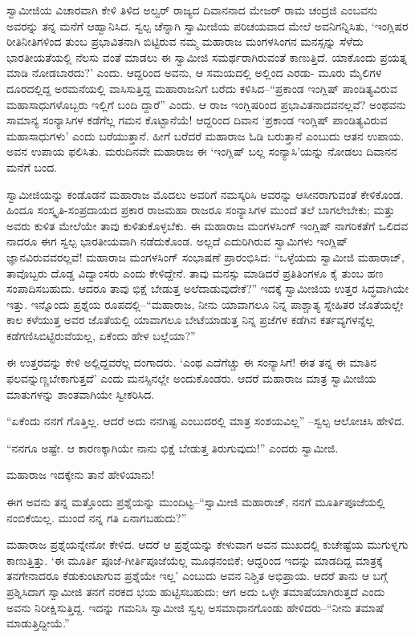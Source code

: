 ಸ್ವಾಮೀಜಿಯ ವಿಚಾರವಾಗಿ ಕೇಳಿ ತಿಳಿದ ಅಲ್ವರ್ ರಾಜ್ಯದ ದಿವಾನನಾದ ಮೇಜರ್ ರಾಮ ಚಂದ್ರಜಿ ಎಂಬವನು ಅವರನ್ನು ತನ್ನ ಮನೆಗೆ ಆಹ್ವಾನಿಸಿದ. ಸ್ವಲ್ಪ ಚೆನ್ನಾಗಿ ಸ್ವಾಮೀಜಿಯ ಪರಿಚಯವಾದ ಮೇಲೆ ಅವನಿಗನ್ನಿಸಿತು, ‘ಇಂಗ್ಲಿಷರ ರೀತಿನೀತಿಗಳಿಂದ ತುಂಬ ಪ್ರಭಾವಿತನಾಗಿ ಬಿಟ್ಟಿರುವ ನಮ್ಮ ಮಹಾರಾಜ ಮಂಗಳಸಿಂಗನ ಮನಸ್ಸನ್ನು ಸೆಳೆದು ಭಾರತೀಯತೆಯಲ್ಲಿ ನೆಲಸು ವಂತೆ ಮಾಡಲು ಈ ಸ್ವಾಮೀಜಿ ಸಮರ್ಥರಾಗಿರುವಂತೆ ಕಾಣುತ್ತಿದೆ. ಯಾಕೊಂದು ಪ್ರಯತ್ನ ಮಾಡಿ ನೋಡಬಾರದು?’ ಎಂದು. ಆದ್ದರಿಂದ ಅವನು, ಆ ಸಮಯದಲ್ಲಿ ಅಲ್ಲಿಂದ ಎರಡು- ಮೂರು ಮೈಲಿಗಳ ದೂರದಲ್ಲಿದ್ದ ಅರಮನೆಯಲ್ಲಿ ವಾಸಿಸುತ್ತಿದ್ದ ಮಹಾರಾಜನಿಗೆ ಬರೆದು ಕಳಿಸಿದ–“ಪ್ರಕಾಂಡ ಇಂಗ್ಲಿಷ್ ಪಾಂಡಿತ್ಯವಿರುವ ಮಹಾಸಾಧುಗಳೊಬ್ಬರು ಇಲ್ಲಿಗೆ ಬಂದಿ ದ್ದಾರೆ” ಎಂದು. ಆ ರಾಜ ಇಂಗ್ಲಿಷರಿಂದ ಪ್ರಭಾವಿತನಾದವನಲ್ಲವೆ? ಅಂಥವನು ಸಾಮಾನ್ಯ ಸಂನ್ಯಾಸಿಗಳ ಕಡೆಗೆಲ್ಲ ಗಮನ ಕೊಟ್ಟಾನೆಯೆ! ಆದ್ದರಿಂದ ದಿವಾನ ‘ಪ್ರಕಾಂಡ ಇಂಗ್ಲಿಷ್ ಪಾಂಡಿತ್ಯವಿರುವ ಮಹಾಸಾಧುಗಳು’ ಎಂದು ಬರೆಯುತ್ತಾನೆ. ಹೀಗೆ ಬರೆದರೆ ಮಹಾರಾಜ ಓಡಿ ಬರುತ್ತಾನೆ ಎಂಬುದು ಆತನ ಉಪಾಯ. ಅವನ ಉಪಾಯ ಫಲಿಸಿತು. ಮರುದಿನವೇ ಮಹಾರಾಜ ಈ ‘ಇಂಗ್ಲಿಷ್ ಬಲ್ಲ ಸಂನ್ಯಾಸಿ’ಯನ್ನು ನೋಡಲು ದಿವಾನನ ಮನೆಗೆ ಬಂದ.

ಸ್ವಾಮೀಜಿಯನ್ನು ಕಂಡೊಡನೆ ಮಹಾರಾಜ ಮೊದಲು ಅವರಿಗೆ ನಮಸ್ಕರಿಸಿ ಅವರನ್ನು ಆಸೀನರಾಗುವಂತೆ ಕೇಳಿಕೊಂಡ. ಹಿಂದೂ ಸಂಸ್ಕೃತಿ-ಸಂಪ್ರದಾಯದ ಪ್ರಕಾರ ರಾಜಮಹಾ ರಾಜರೂ ಸಂನ್ಯಾಸಿಗಳ ಮುಂದೆ ತಲೆ ಬಾಗಲೇಬೇಕು; ಮತ್ತು ಅವರು ಕುಳಿತ ಮೇಲೆಯೇ ತಾವು ಕುಳಿತುಕೊಳ್ಳಬೆಕು. ಈ ಮಹಾರಾಜ ಮಂಗಳಸಿಂಗ್ ಇಂಗ್ಲಿಷ್ ನಾಗರಿಕತೆಗೆ ಒಲಿದವ ನಾದರೂ ಈಗ ಸ್ವಲ್ಪ ಭಾರತೀಯವಾಗಿ ನಡೆದುಕೊಂಡ. ಅಲ್ಲದೆ ಎದುರಿಗಿರುವ ಸ್ವಾಮಿಗಳು ಇಂಗ್ಲಿಷ್ ಜ್ಞಾನವಿರುವವರಲ್ಲವೆ! ಮಹಾರಾಜ ಮಂಗಳಸಿಂಗ್ ಸಂಭಾಷಣೆ ಪ್ರಾರಂಭಿಸಿದ: “ಒಳ್ಳೆಯದು ಸ್ವಾಮೀಜಿ ಮಹಾರಾಜ್, ತಾವೊಬ್ಬರು ದೊಡ್ಡ ವಿದ್ವಾಂಸರು ಎಂದು ಕೇಳಿದ್ದೇನೆ. ತಾವು ಮನಸ್ಸು ಮಾಡಿದರೆ ಪ್ರತಿತಿಂಗಳೂ ಕೈ ತುಂಬ ಹಣ ಸಂಪಾದಿಸಬಹುದು. ಆದರೂ ತಾವು ಭಿಕ್ಷೆ ಬೇಡುತ್ತ ಅಲೆದಾಡುವುದೇಕೆ?” ಇದಕ್ಕೆ ಸ್ವಾಮೀಜಿಯ ಉತ್ತರ ಸಿದ್ಧವಾಗಿಯೇ ಇತ್ತು. ಇನ್ನೊಂದು ಪ್ರಶ್ನೆಯ ರೂಪದಲ್ಲಿ–“ಮಹಾರಾಜ, ನೀನು ಯಾವಾಗಲೂ ನಿನ್ನ ಪಾಶ್ಚಾತ್ಯ ಸ್ನೇಹಿತರ ಜೊತೆಯಲ್ಲೇ ಕಾಲ ಕಳೆಯುತ್ತ ಅವರ ಜೊತೆಯಲ್ಲಿ ಯಾವಾಗಲೂ ಬೇಟೆಯಾಡುತ್ತ ನಿನ್ನ ಪ್ರಜೆಗಳ ಕಡೆಗಿನ ಕರ್ತವ್ಯಗಳನ್ನೆಲ್ಲ ಕಡೆಗಣಿಸಿಬಿಟ್ಟಿರುವೆಯಲ್ಲ, ಏಕೆಂದು ಹೇಳ ಬಲ್ಲೆಯಾ?”

ಈ ಉತ್ತರವನ್ನು ಕೇಳಿ ಅಲ್ಲಿದ್ದವರೆಲ್ಲ ದಂಗಾದರು. ‘ಎಂಥ ಎದೆಗೆಚ್ಚು ಈ ಸಂನ್ಯಾಸಿಗೆ! ಈತ ತನ್ನ ಈ ಮಾತಿನ ಫಲವನ್ನುಣ್ಣಬೇಕಾಗುತ್ತದೆ’ ಎಂದು ಮನಸ್ಸಿನಲ್ಲೇ ಅಂದುಕೊಂಡರು. ಆದರೆ ಮಹಾರಾಜ ಮಾತ್ರ ಸ್ವಾಮೀಜಿಯ ಮಾತುಗಳನ್ನು ಶಾಂತವಾಗಿಯೇ ಸ್ವೀಕರಿಸಿದ.

“ಏಕೆಂದು ನನಗೆ ಗೊತ್ತಿಲ್ಲ. ಆದರೆ ಅದು ನನಗಿಷ್ಟ ಎಂಬುದರಲ್ಲಿ ಮಾತ್ರ ಸಂಶಯವಿಲ್ಲ” –ಸ್ವಲ್ಪ ಆಲೋಚಿಸಿ ಹೇಳಿದ.

“ನನಗೂ ಅಷ್ಟೇ. ಆ ಕಾರಣಕ್ಕಾಗಿಯೇ ನಾನು ಭಿಕ್ಷೆ ಬೇಡುತ್ತ ತಿರುಗುವುದು!” ಎಂದರು ಸ್ವಾಮೀಜಿ.

ಮಹಾರಾಜ ಇದಕ್ಕೇನು ತಾನೆ ಹೇಳಿಯಾನು!

ಈಗ ಅವನು ತನ್ನ ಮತ್ತೊಂದು ಪ್ರಶ್ನೆಯನ್ನು ಮುಂದಿಟ್ಟ–“ಸ್ವಾಮೀಜಿ ಮಹಾರಾಜ್, ನನಗೆ ಮೂರ್ತಿಪೂಜೆಯಲ್ಲಿ ನಂಬಿಕೆಯಿಲ್ಲ. ಮುಂದೆ ನನ್ನ ಗತಿ ಏನಾಗಬಹುದು?”

ಮಹಾರಾಜ ಪ್ರಶ್ನೆಯನ್ನೇನೋ ಕೇಳಿದ. ಆದರೆ ಆ ಪ್ರಶ್ನೆಯನ್ನು ಕೇಳುವಾಗ ಅವನ ಮುಖದಲ್ಲಿ ಕುಚೇಷ್ಟೆಯ ಮುಗುಳ್ನಗು ಕಾಣುತ್ತಿತ್ತು. ‘ಈ ಮೂರ್ತಿ ಪೂಜೆ-ಗೀರ್ತಿಪೂಜೆಯೆಲ್ಲ ಮೂಢನಂಬಿಕೆ; ಆದ್ದರಿಂದ ಇದನ್ನು ಮಾಡದಿದ್ದ ಮಾತ್ರಕ್ಕೆ ತನಗೇನಾದರೂ ಕೆಡುಕುಂಟಾಗುವ ಪ್ರಶ್ನೆಯೇ ಇಲ್ಲ’ ಎಂಬುದು ಅವನ ನಿಶ್ಚಿತ ಅಭಿಪ್ರಾಯ. ಆದರೆ ತಾನು ಆ ಬಗ್ಗೆ ಪ್ರಶ್ನಿಸಿದಾಗ ಸ್ವಾಮೀಜಿ ತನಗೆ ನರಕದ ಭಯ ಹುಟ್ಟಿಸಬಹುದು; ಆಗ ಅದು ಒಳ್ಳೇ ತಮಾಷೆಯಾಗಿರುತ್ತದೆ ಎಂದು ಅವನು ನಿರೀಕ್ಷಿಸುತ್ತಿದ್ದ. ಇದನ್ನು ಗಮನಿಸಿ ಸ್ವಾಮೀಜಿ ಸ್ವಲ್ಪ ಅಸಮಾಧಾನಗೊಂಡು ಹೇಳಿದರು–“ನೀನು ತಮಾಷೆ ಮಾಡುತ್ತಿದ್ದೀಯೆ.”

